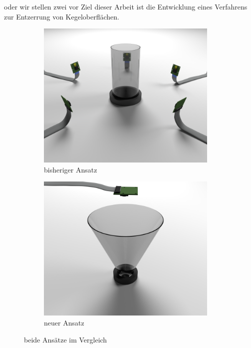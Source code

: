 oder wir stellen zwei vor
Ziel dieser Arbeit ist die Entwicklung eines Verfahrens zur Entzerrung von Kegeloberflächen. 

\begin{figure}[!htb]
	\centering
	\begin{subfigure}{.5\textwidth}
		\centering
		\includegraphics[width=0.95\textwidth]{images/renderCylinder.png}
		\caption{bisheriger Ansatz}
		\label{fig:oldSetup}
	\end{subfigure}%
	\begin{subfigure}{.5\textwidth}
		\centering
		\includegraphics[width=0.95\textwidth]{images/renderCone.png}
		\caption{neuer Ansatz}
		\label{fig:newSetup}
	\end{subfigure}
	\caption{beide Ansätze im Vergleich}
	\label{fig:renderedSetup}
\end{figure}